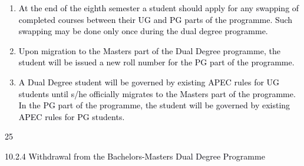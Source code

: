 \documentclass[12pt]{article}
\begin{document}
\begin{enumerate}
\vspace{\baselineskip}
	\item {\fontsize{9pt}{10.8pt}\selectfont \textcolor[HTML]{00000A}{At the end of the eighth semester a student should apply for any swapping of completed courses between their UG and PG parts of the programme. Such swapping may be done only once during the dual degree programme.}\par}\par


\vspace{\baselineskip}
	\item {\fontsize{10pt}{12.0pt}\selectfont \textcolor[HTML]{00000A}{Upon migration to the Masters part of the Dual Degree programme, the student will be issued a new roll number for the PG part of the programme.}\par}\par


\vspace{\baselineskip}
	\item {\fontsize{10pt}{12.0pt}\selectfont \textcolor[HTML]{00000A}{A Dual Degree student will be governed by existing APEC rules for UG students until s/he officially migrates to the Masters part of the programme. In the PG part of the programme, the student will be governed by existing APEC rules for PG students.}\par}
\end{enumerate}\par


\vspace{\baselineskip}
\begin{Center}
\textcolor[HTML]{00000A}{25}
\end{Center}\par


\vspace{\baselineskip}
{\fontsize{10pt}{12.0pt}\selectfont \textcolor[HTML]{00000A}{10.2.4 Withdrawal from the Bachelors-Masters Dual Degree Programme}\par}\par
\end{document}
